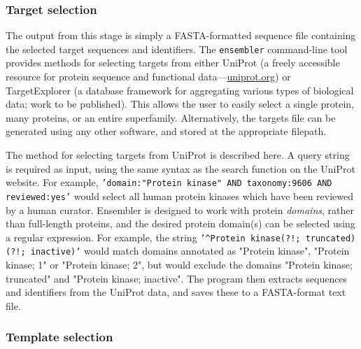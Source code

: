\documentclass[aps,pre,twocolumn,nofootinbib,superscriptaddress,linenumbers]{revtex4-1}
\begin{document}
\subsubsection{Target selection}

The output from this stage is simply a FASTA-formatted sequence file containing the selected target sequences and identifiers. 
The {\tt ensembler} command-line tool provides methods for selecting targets from either UniProt (a freely accessible resource for protein sequence and functional data---\href{http://www.uniprot.org/}{uniprot.org}) or TargetExplorer (a database framework for aggregating various types of biological data; work to be published). 
This allows the user to easily select a single protein, many proteins, or an entire superfamily. Alternatively, the targets file can be generated using any other software, and stored at the appropriate filepath.

The method for selecting targets from UniProt is described here. 
A query string is required as input, using the same syntax as the search function on the UniProt website. 
For example, {\tt'domain:"Protein kinase" AND taxonomy:9606 AND reviewed:yes'} would select all human protein kinases which have been reviewed by a human curator. 
Ensembler is designed to work with protein \emph{domains}, rather than full-length proteins, and the desired protein domain(s) can be selected using a regular expression. 
For example, the string {\tt'\^{}Protein kinase(?!; truncated)(?!; inactive)'} would match domains annotated as "Protein kinase", "Protein kinase; 1" or "Protein kinase; 2", but would exclude the domains "Protein kinase; truncated" and "Protein kinase; inactive". 
The program then extracts sequences and identifiers from the UniProt data, and saves these to a FASTA-format text file.


\subsubsection{Template selection}
\end{document}
